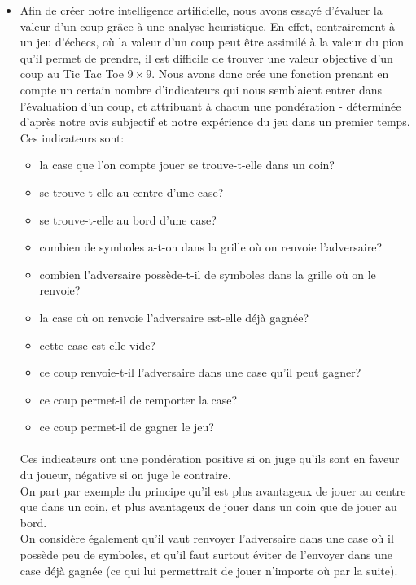 \documentclass[10pt]{article}
\begin{document}
\begin{enumerate}
\begin{itemize}
    \paragraph{}
    \item Afin de créer notre intelligence artificielle, nous avons essayé d'évaluer la valeur d'un coup grâce à une analyse heuristique. 
    En effet, contrairement à un jeu d'échecs, où la valeur d'un coup peut être assimilé à la valeur du pion qu'il permet de prendre, il est difficile de trouver une valeur objective d'un coup au Tic Tac Toe $9\times9$. Nous avons donc crée une fonction prenant en compte un certain nombre d'indicateurs qui nous semblaient entrer dans l'évaluation d'un coup, et attribuant à chacun une pondération - déterminée d'après notre avis subjectif et notre expérience du jeu dans un premier temps. \\
    Ces indicateurs sont: 
    \begin{itemize}
        \item la case que l'on compte jouer se trouve-t-elle dans un coin? 
        \item se trouve-t-elle au centre d'une case? 
        \item se trouve-t-elle au bord d'une case? 
        \item combien de symboles a-t-on dans la grille où on renvoie l'adversaire?
        \item combien l'adversaire possède-t-il de symboles dans la grille où on le renvoie?  
        \item la case où on renvoie l'adversaire est-elle déjà gagnée?  
        \item cette case est-elle vide? 
        \item ce coup renvoie-t-il l'adversaire dans une case qu'il peut gagner? 
        \item ce coup permet-il de remporter la case? 
        \item ce coup permet-il de gagner le jeu? 
    \end{itemize}
\paragraph{}
Ces indicateurs ont une pondération positive si on juge qu'ils sont en faveur du joueur, négative si on juge le contraire. \\
On part par exemple du principe qu'il est plus avantageux de jouer au centre que dans un coin, et plus avantageux de jouer dans un coin que de jouer au bord. \\
On considère également qu'il vaut renvoyer l'adversaire dans une case où il possède peu de symboles, et qu'il faut surtout éviter de l'envoyer dans une case déjà gagnée (ce qui lui permettrait de jouer n'importe où par la suite). 

\end{itemize}
\end{enumerate}
\end{document}
